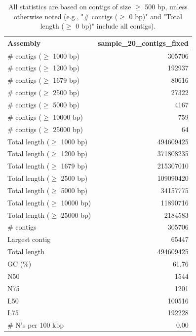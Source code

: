 \documentclass[12pt,a4paper]{article}
\begin{document}
\begin{table}[ht]
\begin{center}
\caption{All statistics are based on contigs of size $\geq$ 500 bp, unless otherwise noted (e.g., "\# contigs ($\geq$ 0 bp)" and "Total length ($\geq$ 0 bp)" include all contigs).}
\begin{tabular}{|l*{1}{|r}|}
\hline
Assembly & sample\_20\_contigs\_fixed \\ \hline
\# contigs ($\geq$ 1000 bp) & 305706 \\ \hline
\# contigs ($\geq$ 1200 bp) & 192937 \\ \hline
\# contigs ($\geq$ 1679 bp) & 80616 \\ \hline
\# contigs ($\geq$ 2500 bp) & 27322 \\ \hline
\# contigs ($\geq$ 5000 bp) & 4167 \\ \hline
\# contigs ($\geq$ 10000 bp) & 759 \\ \hline
\# contigs ($\geq$ 25000 bp) & 64 \\ \hline
Total length ($\geq$ 1000 bp) & 494609425 \\ \hline
Total length ($\geq$ 1200 bp) & 371808235 \\ \hline
Total length ($\geq$ 1679 bp) & 215307010 \\ \hline
Total length ($\geq$ 2500 bp) & 109090420 \\ \hline
Total length ($\geq$ 5000 bp) & 34157775 \\ \hline
Total length ($\geq$ 10000 bp) & 11890716 \\ \hline
Total length ($\geq$ 25000 bp) & 2184583 \\ \hline
\# contigs & 305706 \\ \hline
Largest contig & 65447 \\ \hline
Total length & 494609425 \\ \hline
GC (\%) & 61.76 \\ \hline
N50 & 1544 \\ \hline
N75 & 1201 \\ \hline
L50 & 100516 \\ \hline
L75 & 192228 \\ \hline
\# N's per 100 kbp & 0.00 \\ \hline
\end{tabular}
\end{center}
\end{table}
\end{document}
